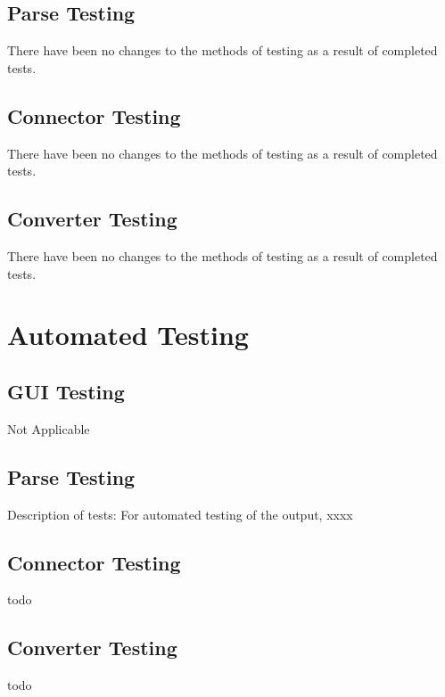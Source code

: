 \documentclass[12pt, titlepage]{article}
\begin{document}
	\subsection{Parse Testing}
  There have been no changes to the methods of testing as a result of completed tests. 
	\subsection{Connector Testing}
  There have been no changes to the methods of testing as a result of completed tests. 
	\subsection{Converter Testing}
  There have been no changes to the methods of testing as a result of completed tests. 

\section{Automated Testing}
	\subsection{GUI Testing}
		Not Applicable
	\subsection{Parse Testing}
		Description of tests: For automated testing of the output, xxxx 
	\subsection{Connector Testing}
		todo
	\subsection{Converter Testing}
        todo
		
\end{document}
